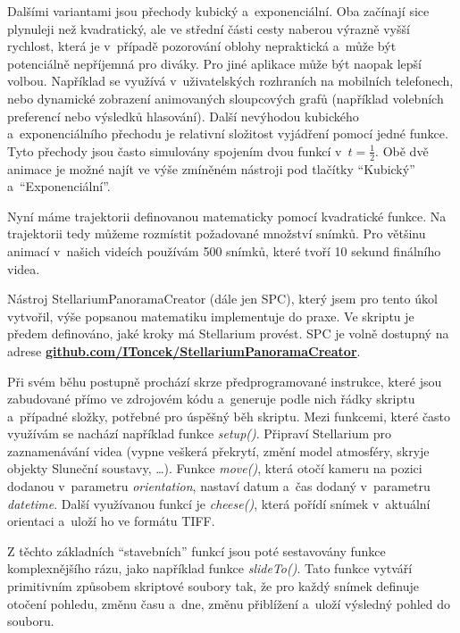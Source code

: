 \documentclass[12pt,a4paper,titlepage]{article}
\newcommand{\link}[2]{\href{#1}{\textcolor{link-color}{\textbf{#2}}}}%
\begin{document}
Dalšími variantami jsou přechody kubický a~exponenciální. Oba začínají sice plynuleji než kvadratický, ale ve střední části cesty naberou výrazně vyšší rychlost, která je v~případě pozorování oblohy nepraktická a~může být potenciálně nepříjemná pro diváky. Pro jiné aplikace může být naopak lepší volbou. Například se využívá v~uživatelských rozhraních na mobilních telefonech, nebo dynamické zobrazení animovaných sloupcových grafů (například volebních preferencí nebo výsledků hlasování). Další nevýhodou kubického a~exponenciálního přechodu je relativní složitost vyjádření pomocí jedné funkce. Tyto přechody jsou často simulovány spojením dvou funkcí v~$t=\frac{1}{2}$. Obě dvě animace je možné najít ve výše zmíněném nástroji pod tlačítky \enquote{Kubický} a~\enquote{Exponenciální}.

Nyní máme trajektorii definovanou matematicky pomocí kvadratické funkce. Na trajektorii tedy můžeme rozmístit požadované množství snímků. Pro většinu animací v~našich videích používám 500 snímků, které tvoří 10 sekund finálního videa.

Nástroj StellariumPanoramaCreator (dále jen SPC), který jsem pro tento úkol vytvořil, výše popsanou matematiku implementuje do praxe. Ve skriptu je předem definováno, jaké kroky má Stellarium provést. SPC je volně dostupný na adrese \link{https://github.com/IToncek/StellariumPanoramaCreator}{github.com/IToncek/StellariumPanoramaCreator}. 

Při svém běhu postupně prochází skrze předprogramované instrukce, které jsou zabudované přímo ve zdrojovém kódu a~generuje podle nich řádky skriptu a~případné složky, potřebné pro úspěšný běh skriptu. Mezi funkcemi, které často využívám se nachází například funkce \textit{setup()}. Připraví Stellarium pro zaznamenávání videa (vypne veškerá překrytí, změní model atmosféry, skryje objekty Sluneční soustavy, \ldots). Funkce \textit{move()}, která otočí kameru na pozici dodanou v~parametru \textit{orientation}, nastaví datum a~čas dodaný v~parametru \textit{datetime}. Další využívanou funkcí je \textit{cheese()}, která pořídí snímek v~aktuální orientaci a~uloží ho ve formátu TIFF.%

Z těchto základních \enquote{stavebních} funkcí jsou poté sestavovány funkce komplexnějšího rázu, jako například funkce \textit{slideTo()}. Tato funkce vytváří primitivním způsobem skriptové soubory tak, že pro každý snímek definuje otočení pohledu, změnu času a~dne, změnu přiblížení a~uloží výsledný pohled do souboru. %
\end{document}
